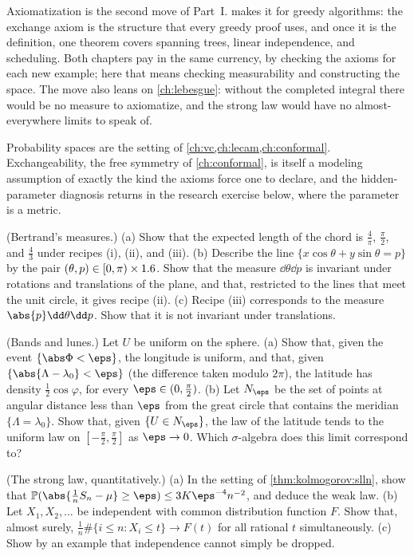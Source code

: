 \begin{refsection}
Axiomatization is the second move of Part~I.  makes it for greedy algorithms: the exchange axiom is the structure that every greedy proof uses, and once it is the definition, one theorem covers spanning trees, linear independence, and scheduling. Both chapters pay in the same currency, by checking the axioms for each new example; here that means checking measurability and constructing the space. The move also leans on \cref{ch:lebesgue}: without the completed integral there would be no measure to axiomatize, and the strong law would have no almost-everywhere limits to speak of.

Probability spaces are the setting of \cref{ch:vc,ch:lecam,ch:conformal}. Exchangeability, the free symmetry of \cref{ch:conformal}, is itself a modeling assumption of exactly the kind the axioms force one to declare, and the hidden-parameter diagnosis returns in the research exercise below, where the parameter is a metric.

\begin{exercises}
\item\label{ex:kolmogorov:bertrand} \consolidation (Bertrand's measures.) (a) Show that the expected length of the chord is $\frac4\pi$, $\frac\pi2$, and $\frac43$ under recipes (i), (ii), and (iii). (b) Describe the line $\{x\cos\theta+y\sin\theta=p\}$ by the pair $(\theta,p)\in[0,\pi)\times1.6$. Show that the measure $\dd\theta\dd p$ is invariant under rotations and translations of the plane, and that, restricted to the lines that meet the unit circle, it gives recipe (ii). (c) Recipe (iii) corresponds to the measure $\abs{p}\dd\theta\dd p$. Show that it is not invariant under translations.

\item\label{ex:kolmogorov:lunes} \consolidation (Bands and lunes.) Let $U$ be uniform on the sphere. (a) Show that, given the event $\{\abs\Phi<\eps\}$, the longitude is uniform, and that, given $\{\abs{\Lambda-\lambda_0}<\eps\}$ (the difference taken modulo $2\pi$), the latitude has density $\frac12\cos\varphi$, for every $\eps\in(0,\frac\pi2)$. (b) Let $N_\eps$ be the set of points at angular distance less than $\eps$ from the great circle that contains the meridian $\{\Lambda=\lambda_0\}$. Show that, given $\{U\in N_\eps\}$, the law of the latitude tends to the uniform law on $[-\frac\pi2,\frac\pi2]$ as $\eps\to0$. Which $\sigma$-algebra does this limit correspond to?

\item\label{ex:kolmogorov:slln} \consolidation (The strong law, quantitatively.) (a) In the setting of \cref{thm:kolmogorov:slln}, show that $\kolP(\abs{\frac1nS_n-\mu}\ge\eps)\le3K\eps^{-4}n^{-2}$, and deduce the weak law. (b) Let $X_1,X_2,\dots$ be independent with common distribution function $F$. Show that, almost surely, $\frac1n\#\{i\le n:X_i\le t\}\to F(t)$ for all rational $t$ simultaneously. (c) Show by an example that independence cannot simply be dropped.


\end{exercises}
\end{refsection}
